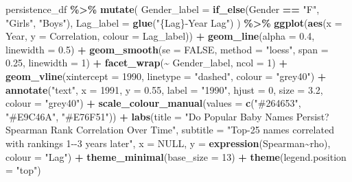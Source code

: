 \documentclass[
]{article}
\newenvironment{Shaded}{\begin{snugshade}}{\end{snugshade}}
\newcommand{\AttributeTok}[1]{\textcolor[rgb]{0.13,0.29,0.53}{#1}}
\newcommand{\ConstantTok}[1]{\textcolor[rgb]{0.56,0.35,0.01}{#1}}
\newcommand{\DecValTok}[1]{\textcolor[rgb]{0.00,0.00,0.81}{#1}}
\newcommand{\FloatTok}[1]{\textcolor[rgb]{0.00,0.00,0.81}{#1}}
\newcommand{\FunctionTok}[1]{\textcolor[rgb]{0.13,0.29,0.53}{\textbf{#1}}}
\newcommand{\NormalTok}[1]{#1}
\newcommand{\SpecialCharTok}[1]{\textcolor[rgb]{0.81,0.36,0.00}{\textbf{#1}}}
\newcommand{\StringTok}[1]{\textcolor[rgb]{0.31,0.60,0.02}{#1}}
\begin{document}
\begin{Shaded}
\begin{Highlighting}[]
\NormalTok{persistence\_df }\SpecialCharTok{\%\textgreater{}\%}
    \FunctionTok{mutate}\NormalTok{(}
        \AttributeTok{Gender\_label =} \FunctionTok{if\_else}\NormalTok{(Gender }\SpecialCharTok{==} \StringTok{"F"}\NormalTok{, }\StringTok{"Girls"}\NormalTok{, }\StringTok{"Boys"}\NormalTok{),}
        \AttributeTok{Lag\_label    =} \FunctionTok{glue}\NormalTok{(}\StringTok{"\{Lag\}{-}Year Lag"}\NormalTok{)}
\NormalTok{    ) }\SpecialCharTok{\%\textgreater{}\%}
    \FunctionTok{ggplot}\NormalTok{(}\FunctionTok{aes}\NormalTok{(}\AttributeTok{x =}\NormalTok{ Year, }\AttributeTok{y =}\NormalTok{ Correlation, }\AttributeTok{colour =}\NormalTok{ Lag\_label)) }\SpecialCharTok{+}
    \FunctionTok{geom\_line}\NormalTok{(}\AttributeTok{alpha =} \FloatTok{0.4}\NormalTok{, }\AttributeTok{linewidth =} \FloatTok{0.5}\NormalTok{) }\SpecialCharTok{+}
    \FunctionTok{geom\_smooth}\NormalTok{(}\AttributeTok{se =} \ConstantTok{FALSE}\NormalTok{, }\AttributeTok{method =} \StringTok{"loess"}\NormalTok{, }\AttributeTok{span =} \FloatTok{0.25}\NormalTok{, }\AttributeTok{linewidth =} \DecValTok{1}\NormalTok{) }\SpecialCharTok{+}
    \FunctionTok{facet\_wrap}\NormalTok{(}\SpecialCharTok{\textasciitilde{}}\NormalTok{ Gender\_label, }\AttributeTok{ncol =} \DecValTok{1}\NormalTok{) }\SpecialCharTok{+}
    \FunctionTok{geom\_vline}\NormalTok{(}\AttributeTok{xintercept =} \DecValTok{1990}\NormalTok{, }\AttributeTok{linetype =} \StringTok{"dashed"}\NormalTok{, }\AttributeTok{colour =} \StringTok{"grey40"}\NormalTok{) }\SpecialCharTok{+}
    \FunctionTok{annotate}\NormalTok{(}\StringTok{"text"}\NormalTok{, }\AttributeTok{x =} \DecValTok{1991}\NormalTok{, }\AttributeTok{y =} \FloatTok{0.55}\NormalTok{, }\AttributeTok{label =} \StringTok{"1990"}\NormalTok{, }\AttributeTok{hjust =} \DecValTok{0}\NormalTok{,}
             \AttributeTok{size =} \FloatTok{3.2}\NormalTok{, }\AttributeTok{colour =} \StringTok{"grey40"}\NormalTok{) }\SpecialCharTok{+}
    \FunctionTok{scale\_colour\_manual}\NormalTok{(}\AttributeTok{values =} \FunctionTok{c}\NormalTok{(}\StringTok{"\#264653"}\NormalTok{, }\StringTok{"\#E9C46A"}\NormalTok{, }\StringTok{"\#E76F51"}\NormalTok{)) }\SpecialCharTok{+}
    \FunctionTok{labs}\NormalTok{(}\AttributeTok{title =} \StringTok{"Do Popular Baby Names Persist? Spearman Rank Correlation Over Time"}\NormalTok{,}
         \AttributeTok{subtitle =} \StringTok{"Top{-}25 names correlated with rankings 1{-}{-}3 years later"}\NormalTok{,}
         \AttributeTok{x =} \ConstantTok{NULL}\NormalTok{, }\AttributeTok{y =} \FunctionTok{expression}\NormalTok{(Spearman}\SpecialCharTok{\textasciitilde{}}\NormalTok{rho), }\AttributeTok{colour =} \StringTok{"Lag"}\NormalTok{) }\SpecialCharTok{+}
    \FunctionTok{theme\_minimal}\NormalTok{(}\AttributeTok{base\_size =} \DecValTok{13}\NormalTok{) }\SpecialCharTok{+}
    \FunctionTok{theme}\NormalTok{(}\AttributeTok{legend.position =} \StringTok{"top"}\NormalTok{)}
\end{Highlighting}
\end{Shaded}
\end{document}
